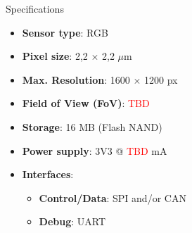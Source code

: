 %
%
%
%
%

%
%
%
%
%


\begin{frame}{Specifications}

    \begin{itemize}
        \item \textbf{Sensor type}: RGB
        \item \textbf{Pixel size}: 2,2 $\times$ 2,2 $\mu$m
        \item \textbf{Max. Resolution}: 1600 $\times$ 1200 px
        \item \textbf{Field of View (FoV)}: \textcolor{red}{TBD}
        \item \textbf{Storage}: 16 MB (Flash NAND)
        \item \textbf{Power supply}: 3V3 @ \textcolor{red}{TBD} mA
        \item \textbf{Interfaces}:
            \begin{itemize}
                \item \textbf{Control/Data}: SPI and/or CAN
                \item \textbf{Debug}: UART
            \end{itemize}
    \end{itemize}

\end{frame}


